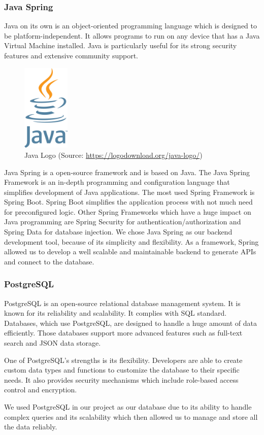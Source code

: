 \Author{\daAuthorThree} %

\subsubsection{Java Spring}
Java on its own is an object-oriented programming language which is designed to be platform-independent. It allows programs to run on any device that has a Java Virtual Machine installed. Java is particularly useful for its strong security features and extensive community support.

\begin{figure} [H]
    \center
    \includegraphics [width=0.2\textwidth] {images/Technologies/javaLogo.png}
    \caption{Java Logo (Source: \url{https://logodownload.org/java-logo/})}
\end{figure}

Java Spring is a open-source framework and is based on Java. The Java Spring Framework is an in-depth programming and configuration language that simplifies development of Java applications. The most used Spring Framework is Spring Boot. Spring Boot simplifies the application process with not much need for preconfigured logic. Other Spring Frameworks which have a huge impact on Java programming are Spring Security for authentication/authorization and Spring Data for database injection. 
We chose Java Spring as our backend development tool, because of its simplicity and flexibility. As a framework, Spring allowed us to develop a well scalable and maintainable backend to generate APIs and connect to the database.       

\subsubsection{PostgreSQL}
PostgreSQL is an open-source relational database management system. It is known for its reliability and scalability. It complies with SQL standard. Databases, which use PostgreSQL, are designed to handle a huge amount of data efficiently. Those databases support more advanced features such as full-text search and JSON data storage.

One of PostgreSQL's strengths is its flexibility. Developers are able to create custom data types and functions to customize the database to their specific needs. It also provides security mechanisms which include role-based access control and encryption.

We used PostgreSQL in our project as our database due to its ability to handle complex queries and its scalability which then allowed us to manage and store all the data reliably.

\newpage